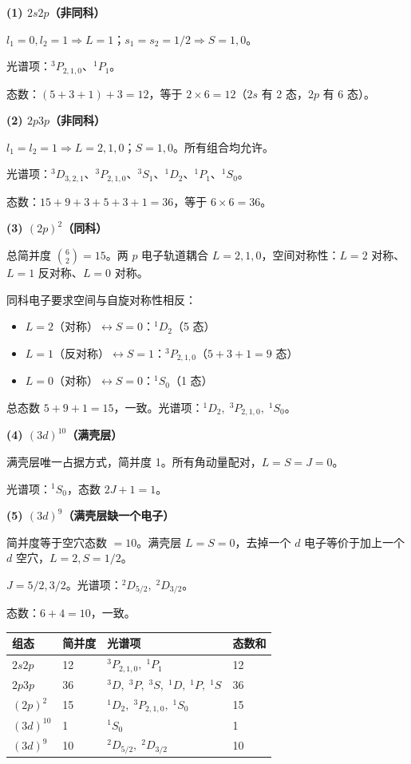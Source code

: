 \begin{derivationbox}[标准解题过程]
\textbf{(1) $2s2p$（非同科）}

$l_1=0,l_2=1\Rightarrow L=1$；$s_1=s_2=1/2\Rightarrow S=1,0$。

光谱项：$^3P_{2,1,0}$、$^1P_1$。

态数：$(5+3+1)+3=12$，等于 $2\times6=12$（$2s$ 有 2 态，$2p$ 有 6 态）。

\textbf{(2) $2p3p$（非同科）}

$l_1=l_2=1\Rightarrow L=2,1,0$；$S=1,0$。所有组合均允许。

光谱项：$^3D_{3,2,1}$、$^3P_{2,1,0}$、$^3S_1$、$^1D_2$、$^1P_1$、$^1S_0$。

态数：$15+9+3+5+3+1=36$，等于 $6\times6=36$。

\textbf{(3) $(2p)^2$（同科）}

总简并度 $\binom{6}{2}=15$。两 $p$ 电子轨道耦合 $L=2,1,0$，空间对称性：$L=2$ 对称、$L=1$ 反对称、$L=0$ 对称。

同科电子要求空间与自旋对称性相反：
\begin{itemize}
    \item $L=2$（对称）$\leftrightarrow S=0$：$^1D_2$（5 态）
    \item $L=1$（反对称）$\leftrightarrow S=1$：$^3P_{2,1,0}$（$5+3+1=9$ 态）
    \item $L=0$（对称）$\leftrightarrow S=0$：$^1S_0$（1 态）
\end{itemize}

总态数 $5+9+1=15$，一致。光谱项：$\boxed{^1D_2,\;^3P_{2,1,0},\;^1S_0}$。

\textbf{(4) $(3d)^{10}$（满壳层）}

满壳层唯一占据方式，简并度 1。所有角动量配对，$L=S=J=0$。

光谱项：$\boxed{^1S_0}$，态数 $2J+1=1$。

\textbf{(5) $(3d)^9$（满壳层缺一个电子）}

简并度等于空穴态数 $=10$。满壳层 $L=S=0$，去掉一个 $d$ 电子等价于加上一个 $d$ 空穴，$L=2,S=1/2$。

$J=5/2,3/2$。光谱项：$\boxed{^2D_{5/2},\;^2D_{3/2}}$。

态数：$6+4=10$，一致。
\end{derivationbox}

\begin{formulabox}[答案汇总]
\begin{center}
\begin{tabular}{llll}
\toprule
\textbf{组态} & \textbf{简并度} & \textbf{光谱项} & \textbf{态数和} \\
\midrule
$2s2p$ & 12 & $^3P_{2,1,0},\;^1P_1$ & 12 \\
$2p3p$ & 36 & $^3D,\;^3P,\;^3S,\;^1D,\;^1P,\;^1S$ & 36 \\
$(2p)^2$ & 15 & $^1D_2,\;^3P_{2,1,0},\;^1S_0$ & 15 \\
$(3d)^{10}$ & 1 & $^1S_0$ & 1 \\
$(3d)^9$ & 10 & $^2D_{5/2},\;^2D_{3/2}$ & 10 \\
\bottomrule
\end{tabular}
\end{center}
\end{formulabox}

